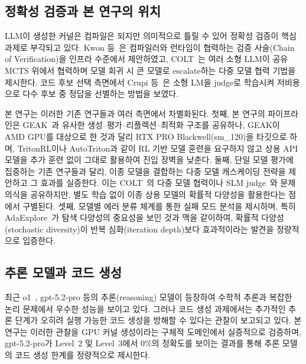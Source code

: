 \documentclass[sigplan,screen,review,anonymous]{acmart}
\begin{document}
\subsection{정확성 검증과 본 연구의 위치}

LLM이 생성한 커널은 컴파일은 되지만 의미적으로 틀릴 수 있어
정확성 검증이 핵심 과제로 부각되고 있다.
Kwon 등~\cite{kwon2026cove}은 컴파일러와 런타임이 협력하는 검증 사슬(Chain of Verification)을
인프라 수준에서 제안하였고,
COLT~\cite{tang2026colt}는 여러 소형 LLM이 공유 MCTS 위에서 협력하며
모델 회귀 시 큰 모델로 escalate하는 다중 모델 협력 기법을 제시한다.
코드 후보 선택 측면에서 Crupi 등~\cite{crupi2026slmjudge}은 소형 LM을 judge로 학습시켜
저비용으로 다수 후보 중 정답을 선별하는 방법을 보였다.

본 연구는 이러한 기존 연구들과 여러 측면에서 차별화된다.
첫째, 본 연구의 파이프라인은 GEAK~\cite{wang2025geak}과 유사한
생성--평가--리플렉션--최적화 구조를 공유하나,
GEAK이 AMD GPU를 대상으로 한 것과 달리 RTX PRO Blackwell(sm\_120)을 타깃으로 하며,
TritonRL이나 AutoTriton과 같이 RL 기반 모델 훈련을 요구하지 않고
상용 API 모델을 추가 훈련 없이 그대로 활용하여 진입 장벽을 낮춘다.
둘째, 단일 모델 평가에 집중하는 기존 연구들과 달리,
이종 모델을 결합하는 다중 모델 캐스케이딩 전략을 제안하고 그 효과를 실증한다.
이는 COLT~\cite{tang2026colt}의 다중 모델 협력이나 SLM judge~\cite{crupi2026slmjudge}와
문제의식을 공유하지만, 별도 학습 없이 이종 상용 모델의 확률적 다양성을 활용한다는 점에서 구별된다.
셋째, 모델별 에러 분류 체계를 통한 실패 모드 분석을 제시하며,
특히 AdaExplore~\cite{du2026adaexplore}가 탐색 다양성의 중요성을 보인 것과 맥을 같이하여,
확률적 다양성(stochastic diversity)이 반복 심화(iteration depth)보다
효과적이라는 발견을 정량적으로 입증한다.

\subsection{추론 모델과 코드 생성}

최근 o1~\cite{openai2024o1}, gpt-5.2-pro 등의 추론(reasoning) 모델이 등장하여
수학적 추론과 복잡한 논리 문제에서 우수한 성능을 보이고 있다.
그러나 코드 생성 과제에서는 추가적인 추론 단계가
오히려 실행 가능한 코드 생성을 방해할 수 있다는 관찰이 보고되고 있다.
본 연구는 이러한 관찰을 GPU 커널 생성이라는 구체적 도메인에서 실증적으로 검증하며,
gpt-5.2-pro가 Level~2 및 Level~3에서 0\%의 정확도를 보이는 결과를 통해
추론 모델의 코드 생성 한계를 정량적으로 제시한다.


\end{document}
